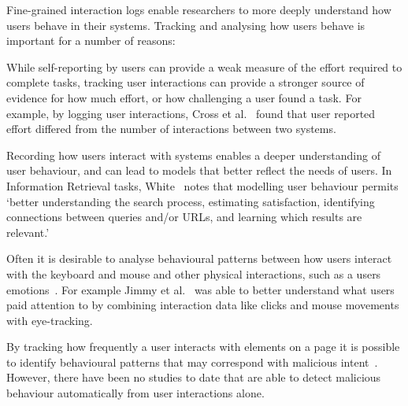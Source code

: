 
Fine-grained interaction logs enable researchers to more deeply understand how users behave in their systems. Tracking and analysing how users behave is important for a number of reasons:

\begin{description}[noitemsep,leftmargin=8pt]
	\item[Evaluation] While self-reporting by users can provide a weak measure of the effort required to complete tasks, tracking user interactions can provide a stronger source of evidence for how much effort, or how challenging a user found a task. For example, by logging user interactions, Cross et al.~\cite{cross2021search} found that user reported effort differed from the number of interactions between two systems.
	\item[User Modelling] Recording how users interact with systems enables a deeper understanding of user behaviour, and can lead to models that better reflect the needs of users. In Information Retrieval tasks, White~\cite{white2016interactions} notes that modelling user behaviour permits `better understanding the search process, estimating satisfaction, identifying connections between queries and/or URLs, and learning which results are relevant.'
	\item[Multi-Modal Interactions] Often it is desirable to analyse behavioural patterns between how users interact with the keyboard and mouse and other physical interactions, such as a users emotions~\cite{arapakis2008affective}. For example Jimmy et al.~\cite{jimmy2020health} was able to better understand what users paid attention to by combining interaction data like clicks and mouse movements with eye-tracking.
	\item[Malicious Users] By tracking how frequently a user interacts with elements on a page it is possible to identify behavioural patterns that may correspond with malicious intent~\cite{gadiraju2015understanding}. However, there have been no studies to date that are able to detect malicious behaviour automatically from user interactions alone.
\end{description}